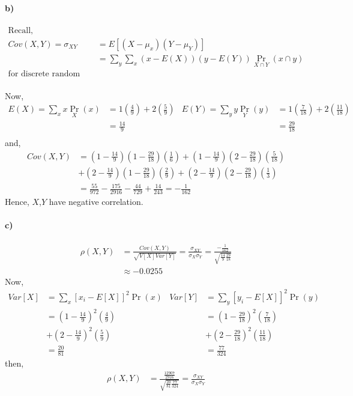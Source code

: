 \documentclass[letterpaper,12pt,titlepage,oneside,final]{book}
\begin{document}
\paragraph{b)}
\begin{align*}
\text{Recall,}\\
Cov(X,Y) = \sigma_{XY} &= E[(X-\mu_{x})(Y-\mu_{Y})]\\
& = \sum_y \sum_x \left(x -E(X)\right)\left(y -E(Y)\right)\Pr_{X \cap Y}(x \cap y)\\
\text{for discrete random variables.}
\end{align*}
\bigskip\\
Now,
\begin{align*}
E(X) =\sum_x x\Pr_X(x) &= 1\left(\frac{4}{9}\right) + 2\left(\frac{5}{9}\right)
&E(Y) =\sum_y y\Pr_Y(y)&= 1\left(\frac{7}{18}\right) + 2\left(\frac{11}{18}\right)\\
&=  \frac{14}{9} 
&&=  \frac{29}{18}\\
\end{align*}
and, 
\begin{align*}
Cov(X,Y) &= \left(1 -\frac{14}{9}\right)\left(1 -\frac{29}{18}\right)\left(\frac{1}{6}\right)+\left(1 -\frac{14}{9}\right)\left(2 -\frac{29}{18}\right)\left(\frac{5}{18}\right)\\
&+\left(2 -\frac{14}{9}\right)\left(1 -\frac{29}{18}\right)\left(\frac{2}{9}\right)+\left(2 -\frac{14}{9}\right)\left(2 -\frac{29}{18}\right)\left(\frac{1}{3}\right)\\
&= \frac{55}{972}-\frac{175}{2916}- \frac{44}{729}+\frac{14}{243} =-\frac{1}{162}
\end{align*}
Hence, $X$,$Y$ have negative correlation.


\paragraph{c)} 
\begin{align*}
\rho(X,Y) &= \frac{Cov(X,Y)}{\sqrt{V[X]Var[Y]}}=\frac{\sigma_{XY}}{\sigma_X \sigma_Y} = \frac{-\frac{1}{162}}{\sqrt{\frac{14}{9}\frac{29}{18}}}\\
&\approx - 0.0255
\end{align*}
Now, 
\begin{align*}
Var[X] &= \sum_x \left[x_i - E[X]\right]^2\Pr(x) &Var[Y]&=\sum_y \left[y_i - E[X]\right]^2\Pr(y)\\
&=\left(1 - \frac{14}{9}\right)^2\left(\frac{4}{9} \right) &&=\left(1 - \frac{29}{18}\right)^2\left(\frac{7}{18} \right)\\
&+\left(2 - \frac{14}{9}\right)^2\left(\frac{5}{9} \right) &&+\left(2 - \frac{29}{18}\right)^2\left(\frac{11}{18} \right)\\
& = \frac{20}{81} &&=\frac{77}{324}
\end{align*}
then, 
\begin{align*}
\rho(X,Y) &= \frac{\frac{12907}{2916}}{\sqrt{\frac{20}{81} \frac{77}{324}}}=\frac{\sigma_{XY}}{\sigma_X \sigma_Y}
\end{align*}
\end{document}
